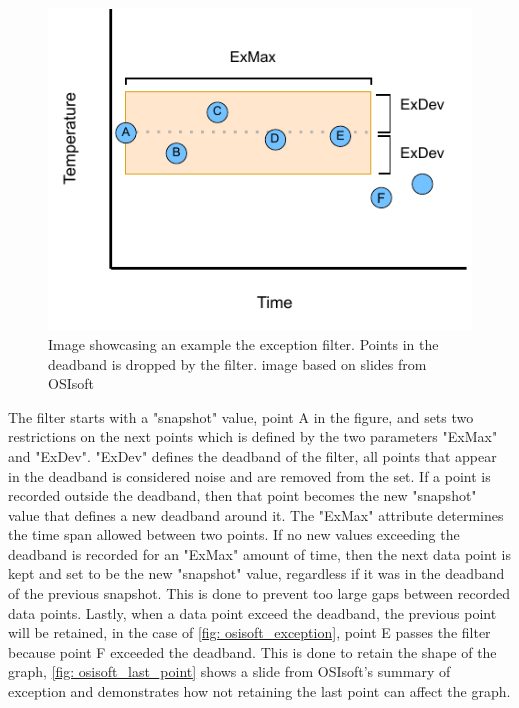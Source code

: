 \documentclass[main.tex]{subfiles}
\begin{document}
\begin{figure}[!ht]
    \centering
    \includegraphics[scale=1.3]{images/exception_process.pdf}
    \caption{Image showcasing an example the exception filter. Points in the deadband is dropped by the filter. image based on slides from OSIsoft\cite{osisoft_image}}
    \label{fig: osisoft_exception}
\end{figure}
\FloatBarrier 
 
The filter starts with a "snapshot" value, point A in the figure, and sets two restrictions on the next points which is defined by the two parameters "ExMax" and "ExDev". "ExDev" defines the deadband of the filter, all points that appear in the deadband is considered noise and are removed from the set. If a point is recorded outside the deadband, then that point becomes the new "snapshot" value that defines a new deadband around it. The "ExMax" attribute determines the time span allowed between two points. If no new values exceeding the deadband is recorded for an "ExMax" amount of time, then the next data point is kept and set to be the new "snapshot" value, regardless if it was in the deadband of the previous snapshot. This is done to prevent too large gaps between recorded data points. Lastly, when a data point exceed the deadband, the previous point will be retained, in the case of \autoref{fig: osisoft_exception}, point E passes the filter because point F exceeded the deadband. This is done to retain the shape of the graph, \autoref{fig: osisoft_last_point} shows a slide from OSIsoft's summary of exception and demonstrates how not retaining the last point can affect the graph.
\end{document}
